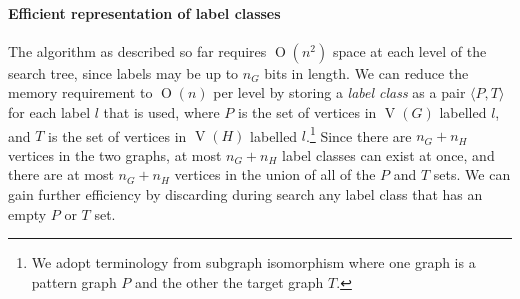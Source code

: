 \documentclass[letterpaper]{article}
\DeclareMathOperator{\V}{V}
\newcommand{\BigO}[1]{\ensuremath{\operatorname{O}\left(#1\right)}}
\begin{document}
\paragraph{Efficient representation of label classes} The algorithm as
described so far requires $\BigO{n^2}$ space at each level of the search tree,
since labels may be up to $n_G$ bits in length. We can reduce the memory
requirement to $\BigO{n}$ per level by storing a \emph{label class} as a pair
$\langle P,T \rangle$ for each label $l$ that is used, where $P$ is the set of
vertices in $\V(G)$ labelled $l$, and $T$ is the set of vertices in $\V(H)$
labelled $l$.\footnote{We adopt terminology from subgraph isomorphism where one
graph is a pattern graph $P$ and the other the target graph $T$.} Since there
are $n_G + n_H$ vertices in the two graphs, at most $n_G + n_H$ label classes
can exist at once, and there are at most $n_G + n_H$ vertices in the union of
all of the $P$ and $T$ sets.  We can gain further efficiency by discarding
during search any label class that has an empty $P$ or $T$ set.
\end{document}
